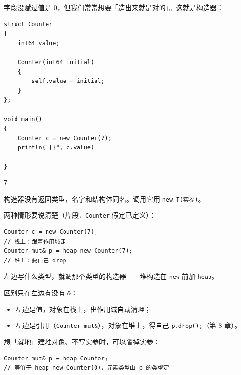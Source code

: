 字段没赋过值是 0，但我们常常想要「造出来就是对的」。这就是构造器：

\par
\medskip
\begin{lstlisting}[style=chali]
struct Counter
{
    int64 value;

    Counter(int64 initial)
    {
        self.value = initial;
    }
};

void main()
{
    Counter c = new Counter(7);
    println("{}", c.value);

}
\end{lstlisting}
\par
\medskip

\par
\medskip
\begin{lstlisting}[style=out]
7
\end{lstlisting}
\par
\medskip

构造器没有返回类型，名字和结构体同名。调用它用 \texttt{new T(\allowbreak{}实参)\allowbreak{}}。

两种情形要说清楚（片段，\texttt{Counter} 假定已定义）：

\par
\medskip
\begin{lstlisting}[style=chali]
Counter c = new Counter(7);
// 栈上：跟着作用域走
Counter mut& p = heap new Counter(7);
// 堆上：要自己 drop
\end{lstlisting}
\par
\medskip

左边写什么类型，就调那个类型的构造器——堆构造在 \texttt{new} 前加 \texttt{heap}。

区别只在左边有没有 \texttt{\&}：

\begin{itemize}

\item 左边是值，对象在栈上，出作用域自动清理；

\item 左边是引用（\texttt{Counter mut\&}），对象在堆上，得自己 \texttt{p.\allowbreak{}drop(\allowbreak{})\allowbreak{};}（第 8 章）。

\end{itemize}

想「就地」建堆对象、不写实参时，可以省掉实参：

\par
\medskip
\begin{lstlisting}[style=chali]
Counter mut& p = heap Counter;
// 等价于 heap new Counter(0)，元素类型由 p 的类型定
\end{lstlisting}
\par
\medskip

